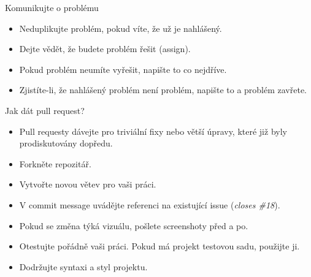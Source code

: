 \documentclass[11pt]{beamer}
\begin{document}
\begin{frame}{Komunikujte o problému}

	\begin{itemize}
		\item Neduplikujte problém, pokud víte, že už je nahlášený.
		\item Dejte vědět, že budete problém řešit (assign).
		\item Pokud problém neumíte vyřešit, napište to co nejdříve.
		\item Zjistíte-li, že nahlášený problém není problém, napište to a problém zavřete.
	\end{itemize}
\end{frame}

\begin{frame}{Jak dát pull request?}
	\begin{itemize}
		\item Pull requesty dávejte pro triviální fixy nebo větší úpravy, které již byly prodiskutovány dopředu.
		\item Forkněte repozitář.
		\item Vytvořte novou větev pro vaši práci.
		\item V commit message uvádějte referenci na existující issue (\textit{closes \#18}).
		\item Pokud se změna týká vizuálu, pošlete screenshoty před a po.
		\item Otestujte pořádně vaši práci. Pokud má projekt testovou sadu, použijte ji.
		\item Dodržujte syntaxi a styl projektu.
	\end{itemize}
\end{frame}
\end{document}

